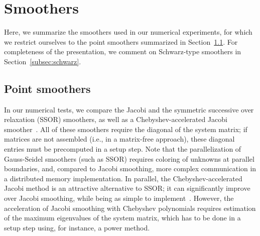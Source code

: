 \documentclass[smallcondensed,final]{svjour3}     %
\begin{document}




\section{Smoothers}
Here, we summarize the smoothers used in our numerical experiments, for
which we restrict ourselves to the point smoothers summarized in
Section~\ref{subsec:ptsmoothers}. For completeness of the
presentation, we comment on Schwarz-type smoothers in
Section~\ref{subsec:schwarz}.


\subsection{Point smoothers}\label{subsec:ptsmoothers}
In our numerical tests, we compare the Jacobi and the
symmetric successive over relaxation (SSOR) smoothers, as well as a
Chebyshev-accelerated Jacobi smoother~\cite{Brandt77}. All of these
smoothers require the diagonal of the system matrix; if matrices are
not assembled (i.e., in a matrix-free approach), these diagonal
entries must be precomputed in a setup step.  Note that the
parallelization of Gauss-Seidel smoothers (such as SSOR) requires
coloring of unknowns at parallel boundaries, and, compared to Jacobi
smoothing, more complex communication in a distributed memory
implementation. In parallel, the Chebyshev-accelerated Jacobi method
is an attractive alternative to SSOR; it can significantly improve
over Jacobi smoothing, while being as simple to
implement~\cite{AdamsBrezinaHuEtAl03}. However, the acceleration of
Jacobi smoothing with Chebyshev polynomials requires estimation of the
maximum eigenvalues of the system matrix, which has to be done in a
setup step using, for instance, a power method.
\end{document}
